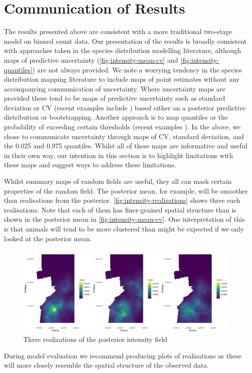 \documentclass[preprint,12pt]{elsarticle}
\begin{document}

\clearpage %

\section{Communication of Results}

The results presented above are consistent with a more traditional two-stage model on binned count data.  Our presentation of the results is broadly consistent with approaches taken in the species distribution modelling literature, although maps of predictive uncertainty (\autoref{fig:intensity-mean-cv} and \autoref{fig:intensity-quantiles}) are not always provided.  We note a worrying tendency in the species distribution mapping literature to include maps of point estimates without any accompanying communication of uncertainty.  Where uncertainty maps are provided these tend to be maps of predictive uncertainty such as standard deviation or CV (recent examples include \cite{ fuller_novel_2018, vallejo_responses_2017,bradbury_mapping_2014}) based either on a posterior predictive distribution or bootstrapping.  Another approach is to map quantiles or the probability of exceeding certain thresholds (recent examples \cite{russell_avoidance_2016, wilson_hierarchical_2010}).  In the above, we chose to communicate uncertainty through maps of CV, standard deviation, and the 0.025 and 0.975 quantiles.  Whilst all of these maps are informative and useful in their own way, our intention in this section is to highlight limitations with these maps and suggest ways to address these limitations.  

Whilst summary maps of random fields are useful, they all can mask certain properties of the random field. The posterior mean, for example, will be smoother than realisations from the posterior.  \autoref{fig:intensity-realizations} shows three such realisations.  Note that each of them has finer-grained spatial structure than is shown in the posterior mean in \autoref{fig:intensity-mean-cv}.  One interpretation of this is that animals will tend to be more clustered than might be expected if we only looked at the posterior mean.
\begin{figure}
	\includegraphics[scale=0.35]{figures/intensity_realized.png}
	\caption{Three realizations of the posterior intensity field}
	\label{fig:intensity-realizations}
\end{figure}
During model evaluation we recommend producing plots of realisations as these will more closely resemble the spatial structure of the observed data.  
\end{document}
